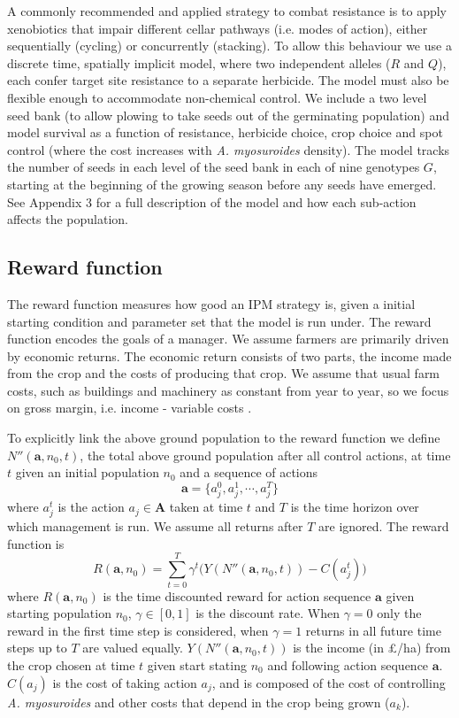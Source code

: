 \documentclass[9pt,twocolumn,twoside,lineno]{pnas-new}
\begin{document}
{A commonly recommended \citep{REX2013} and applied \citep{Hick2018} strategy to combat resistance is to apply xenobiotics that impair different cellar pathways (i.e. modes of action), either sequentially (cycling) or concurrently (stacking). To allow this behaviour we use a discrete time, spatially implicit model, where two independent alleles ($R$ and $Q$), each confer target site resistance to a separate herbicide. The model must also be flexible enough to accommodate non-chemical control. We include a two level seed bank (to allow plowing to take seeds out of the germinating population) and model survival as a function of resistance, herbicide choice, crop choice and spot control (where the cost increases with \textit{A. myosuroides} density). The model tracks the number of seeds in each level of the seed bank in each of nine genotypes $G$, starting at the beginning of the growing season before any seeds have emerged. See Appendix 3 for a full description of the model and how each sub-action affects the population. 

\subsection*{Reward function}
The reward function measures how good an IPM strategy is, given a initial starting condition and parameter set that the model is run under. The reward function encodes the goals of a manager. We assume farmers are primarily driven by economic returns. The economic return consists of two parts, the income made from the crop and the costs of producing that crop. We assume that usual farm costs, such as buildings and machinery as constant from year to year, so we focus on gross margin, i.e. income - variable costs \citep[pp.~3--4]{Nix2016}. 

To explicitly link the above ground population to the reward function we define $N''(\mathbf{a}, n_0, t)$, the total above ground population after all control actions, at time $t$ given an initial population $n_0$ and a sequence of actions 
\begin{equation}
	\mathbf{a} = \{a_j^0, a_j^1, \cdots, a_j^T\}
\end{equation}	  
where $a_j^t$ is the action $a_j \in \mathbf{A}$ taken at time $t$ and $T$ is the time horizon over which management is run. We assume all returns after $T$ are ignored. The reward function is  
\begin{equation}
	R(\mathbf{a}, n_0) = \sum_{t=0}^T \gamma^t \Big( Y(N''(\mathbf{a}, n_0, t)) - C(a_j^t) \Big)
\end{equation}
where $R(\mathbf{a}, n_0)$ is the time discounted reward for action sequence $\mathbf{a}$ given starting population $n_0$, $\gamma \in [0, 1]$ is the discount rate. When $\gamma = 0$ only the reward in the first time step is considered, when $\gamma = 1$ returns in all future time steps up to $T$ are valued equally. $Y(N''(\mathbf{a}, n_0, t))$ is the income (in \pounds /ha) from the crop chosen at time $t$ given start stating $n_0$ and following action sequence $\mathbf{a}$. $C(a_j)$ is the cost of taking action $a_j$, and is composed of the cost of controlling \textit{A. myosuroides} and other costs that depend in the crop being grown ($a_k$).   

}
\end{document}
